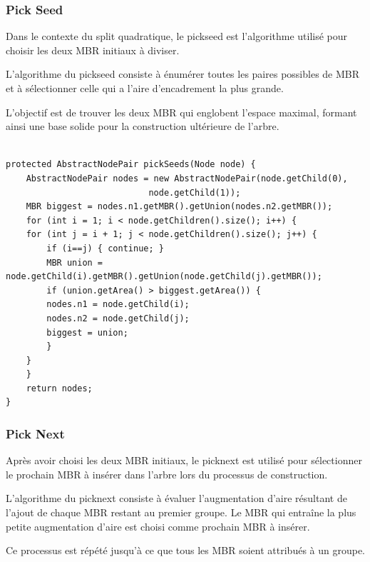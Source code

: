 \documentclass {article}
\begin{document}
\subsubsection {Pick Seed}


Dans le contexte du split quadratique, le pickseed est l'algorithme utilisé pour choisir les 
deux MBR initiaux à diviser.

L'algorithme du pickseed consiste à énumérer toutes les paires possibles de MBR et à sélectionner 
celle qui a l'aire d'encadrement la plus grande.

L'objectif est de trouver les deux MBR qui englobent l'espace maximal, formant ainsi une base solide 
pour la construction ultérieure de l'arbre.

\begin{verbatim}

protected AbstractNodePair pickSeeds(Node node) {
    AbstractNodePair nodes = new AbstractNodePair(node.getChild(0), 
						    node.getChild(1));
    MBR biggest = nodes.n1.getMBR().getUnion(nodes.n2.getMBR());
    for (int i = 1; i < node.getChildren().size(); i++) {
	for (int j = i + 1; j < node.getChildren().size(); j++) {
	    if (i==j) { continue; }
	    MBR union = node.getChild(i).getMBR().getUnion(node.getChild(j).getMBR());
	    if (union.getArea() > biggest.getArea()) {
		nodes.n1 = node.getChild(i);
		nodes.n2 = node.getChild(j);
		biggest = union;
	    }
	}
    }
    return nodes;
}
\end{verbatim}


\subsubsection {Pick Next}

Après avoir choisi les deux MBR initiaux, le picknext est utilisé pour sélectionner le prochain MBR 
à insérer dans l'arbre lors du processus de construction.

L'algorithme du picknext consiste à évaluer l'augmentation d'aire résultant de l'ajout de chaque MBR 
restant au premier groupe. Le MBR qui entraîne la plus petite augmentation d'aire est choisi 
comme prochain MBR à insérer.

Ce processus est répété jusqu'à ce que tous les MBR soient attribués à un groupe.
\end{document}
